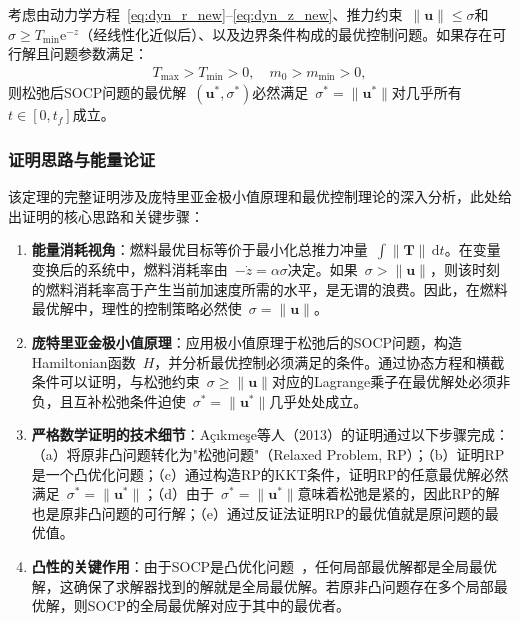 \begin{theorem}
考虑由动力学方程~\eqref{eq:dyn_r_new}--\eqref{eq:dyn_z_new}、推力约束~$\|\bm u\|\le\sigma$和~$\sigma\ge T_{\min}\mathrm{e}^{-z}$（经线性化近似后）、以及边界条件构成的最优控制问题。如果存在可行解且问题参数满足：
\begin{align}
T_{\max} > T_{\min} > 0,\quad m_0 > m_{\min} > 0,
\end{align}
则松弛后SOCP问题的最优解~$(\bm u^*,\sigma^*)$必然满足~$\sigma^*=\|\bm u^*\|$对几乎所有~$t\in[0,t_f]$成立。
\end{theorem}

\subsubsection{证明思路与能量论证}

该定理的完整证明涉及庞特里亚金极小值原理和最优控制理论的深入分析，此处给出证明的核心思路和关键步骤：

\begin{enumerate}
  \item \textbf{能量消耗视角}：燃料最优目标等价于最小化总推力冲量~$\int\|\bm T\|\,\mathrm{d}t$。在变量变换后的系统中，燃料消耗率由~$-\dot z = \alpha\sigma$决定。如果~$\sigma>\|\bm u\|$，则该时刻的燃料消耗率高于产生当前加速度所需的水平，是无谓的浪费。因此，在燃料最优解中，理性的控制策略必然使~$\sigma=\|\bm u\|$。

  \item \textbf{庞特里亚金极小值原理}：应用极小值原理于松弛后的SOCP问题，构造Hamiltonian函数~$H$，并分析最优控制必须满足的条件。通过协态方程和横截条件可以证明，与松弛约束~$\sigma\ge\|\bm u\|$对应的Lagrange乘子在最优解处必须非负，且互补松弛条件迫使~$\sigma^*=\|\bm u^*\|$几乎处处成立。

  \item \textbf{严格数学证明的技术细节}：A\c{c}{\i}kme\c{s}e等人（2013）的证明通过以下步骤完成：（a）将原非凸问题转化为"松弛问题"（Relaxed Problem, RP）；（b）证明RP是一个凸优化问题；（c）通过构造RP的KKT条件，证明RP的任意最优解必然满足~$\sigma^*=\|\bm u^*\|$；（d）由于~$\sigma^*=\|\bm u^*\|$意味着松弛是紧的，因此RP的解也是原非凸问题的可行解；（e）通过反证法证明RP的最优值就是原问题的最优值。

  \item \textbf{凸性的关键作用}：由于SOCP是凸优化问题~\cite{boyd2004convex}，任何局部最优解都是全局最优解，这确保了求解器找到的解就是全局最优解。若原非凸问题存在多个局部最优解，则SOCP的全局最优解对应于其中的最优者。
\end{enumerate}

